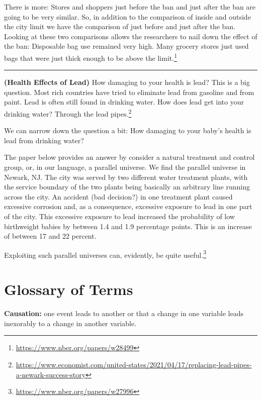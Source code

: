 \documentclass[
]{book}
\begin{document}
There is more: Stores and shoppers just before the ban and just after the ban are going to be very similar. So, in addition to the comparison of inside and outside the city limit we have the comparison of just before and just after the ban. Looking at these two comparisons allows the researchers to nail down the effect of the ban: Disposable bag use remained very high. Many grocery stores just used bags that were just thick enough to be above the limit.\footnote{\url{https://www.nber.org/papers/w28499}}

\begin{center}\rule{0.5\linewidth}{0.5pt}\end{center}

\textbf{(Health Effects of Lead)} How damaging to your health is lead? This is a big question. Most rich countries have tried to eliminate lead from gasoline and from paint. Lead is often still found in drinking water. How does lead get into your drinking water? Through the lead pipes.\footnote{\url{https://www.economist.com/united-states/2021/04/17/replacing-lead-pipes-a-newark-success-story}}

We can narrow down the question a bit: How damaging to your baby's health is lead from drinking water?

The paper below provides an answer by consider a natural treatment and control group, or, in our language, a parallel universe. We find the parallel universe in Newark, NJ. The city was served by two different water treatment plants, with the service boundary of the two plants being basically an arbitrary line running across the city. An accident (bad decision?) in one treatment plant caused excessive corrosion and, as a consequence, excessive exposure to lead in one part of the city. This excessive exposure to lead increased the probability of low birthweight babies by between 1.4 and 1.9 percentage points. This is an increase of between 17 and 22 percent.

Exploiting such parallel universes can, evidently, be quite useful.\footnote{\url{https://www.nber.org/papers/w27996}}

\hypertarget{glossary-of-terms}{%
\section{Glossary of Terms}\label{glossary-of-terms}}

\textbf{Causation:} one event leads to another or that a change in one variable leads inexorably to a change in another variable.
\end{document}
